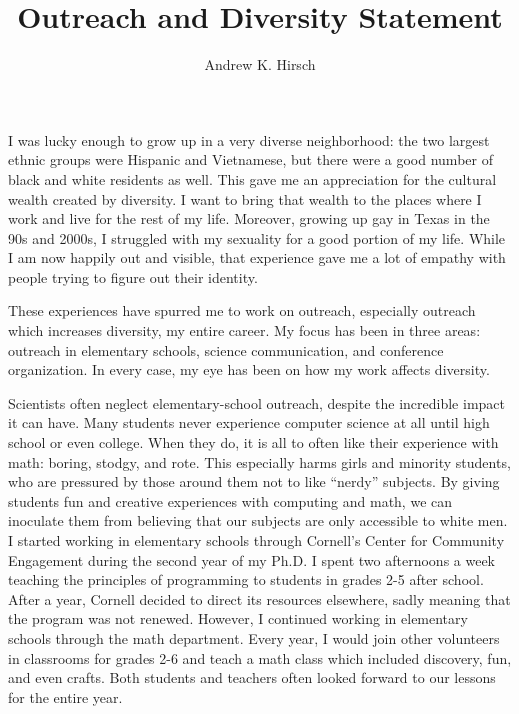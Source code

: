 \documentclass{article}
\author{Andrew K. Hirsch}
\title{Outreach and Diversity Statement}
\date{}
\theoremstyle{definition}
\begin{document}
\maketitle

I was lucky enough to grow up in a very diverse neighborhood: the two largest ethnic groups were Hispanic and Vietnamese, but there were a good number of black and white residents as well.
This gave me an appreciation for the cultural wealth created by diversity.
I want to bring that wealth to the places where I work and live for the rest of my life.
Moreover, growing up gay in Texas in the 90s and 2000s, I struggled with my sexuality for a good portion of my life.
While I am now happily out and visible, that experience gave me a lot of empathy with people trying to figure out their identity.

These experiences have spurred me to work on outreach, especially outreach which increases diversity, my entire career.
My focus has been in three areas: outreach in elementary schools, science communication, and conference organization.
In every case, my eye has been on how my work affects diversity.

Scientists often neglect elementary-school outreach, despite the incredible impact it can have.
Many students never experience computer science at all until high school or even college.
When they do, it is all to often like their experience with math: boring, stodgy, and rote.
This especially harms girls and minority students, who are pressured by those around them not to like ``nerdy'' subjects.
By giving students fun and creative experiences with computing and math, we can inoculate them from believing that our subjects are only accessible to white men.
I started working in elementary schools through Cornell's Center for Community Engagement during the second year of my Ph.D.
I spent two afternoons a week teaching the principles of programming to students in grades 2-5 after school.
After a year, Cornell decided to direct its resources elsewhere, sadly meaning that the program was not renewed.
However, I continued working in elementary schools through the math department.
Every year, I would join other volunteers in classrooms for grades 2-6 and teach a math class which included discovery, fun, and even crafts.
Both students and teachers often looked forward to our lessons for the entire year.
\end{document}
